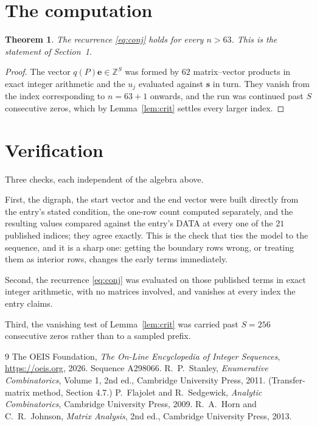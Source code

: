 \documentclass[11pt,a4paper]{article}
\theoremstyle{plain}
\newtheorem{theorem}{Theorem}
\theoremstyle{definition}
\begin{document}
\section{The computation}

\begin{theorem}
The recurrence \eqref{eq:conj} holds for every $n>63$. This is the statement of
Section~1.
\end{theorem}

\begin{proof}
The vector $q(P)\mathbf{e}\in\mathbb{Z}^{S}$ was formed by $62$ matrix--vector
products in exact integer arithmetic and the $u_j$ evaluated against $\mathbf{s}$ in turn.
They vanish from the index corresponding to $n=63+1$ onwards, and the run was continued
past $S$ consecutive zeros, which by Lemma~\ref{lem:crit} settles every larger index.
\end{proof}

\section{Verification}

Three checks, each independent of the algebra above.

First, the digraph, the start vector and the end vector were built directly from the
entry's stated condition, the one-row count computed separately, and the resulting values
compared against the entry's DATA at every one of the $21$ published indices; they
agree exactly. This is the check that ties the model to the sequence, and it is a sharp one:
getting the boundary rows wrong, or treating them as interior rows, changes the early terms
immediately.

Second, the recurrence \eqref{eq:conj} was evaluated on those published terms in exact
integer arithmetic, with no matrices involved, and vanishes at every index the entry claims.

Third, the vanishing test of Lemma~\ref{lem:crit} was carried past $S=256$ consecutive
zeros rather than to a sampled prefix.

\begin{thebibliography}{9}
 The OEIS Foundation, \emph{The On-Line Encyclopedia of Integer
Sequences}, \url{https://oeis.org}, 2026. Sequence A298066.
 R.~P.~Stanley, \emph{Enumerative Combinatorics}, Volume 1, 2nd ed.,
Cambridge University Press, 2011. (Transfer-matrix method, Section 4.7.)
 P.~Flajolet and R.~Sedgewick, \emph{Analytic Combinatorics}, Cambridge
University Press, 2009.
 R.~A.~Horn and C.~R.~Johnson, \emph{Matrix Analysis}, 2nd ed., Cambridge
University Press, 2013.
\end{thebibliography}
\end{document}
